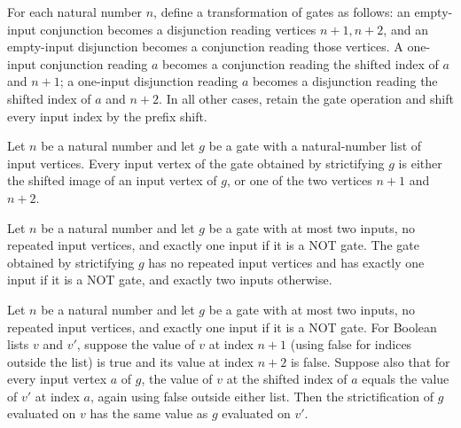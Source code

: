 \begin{definition}
\label{BoolCircuit.strictGate}
\leanok
{}
For each natural number $n$, define a transformation of gates as follows: an empty-input
conjunction becomes a disjunction reading vertices $n+1,n+2$, and an empty-input
disjunction becomes a conjunction reading those vertices. A one-input conjunction
reading $a$ becomes a conjunction reading the shifted index of $a$ and $n+1$; a
one-input disjunction reading $a$ becomes a disjunction reading the shifted index of $a$
and $n+2$. In all other cases, retain the gate operation and shift every input index by
the prefix shift.
\end{definition}

\begin{theorem}
\label{BoolCircuit.strictGate_args}
\leanok
{}
Let $n$ be a natural number and let $g$ be a gate with a natural-number list of input
vertices. Every input vertex of the gate obtained by strictifying $g$ is either the
shifted image of an input vertex of $g$, or one of the two vertices $n+1$ and $n+2$.
\end{theorem}

\begin{theorem}
\label{BoolCircuit.strictGate_strict}
\leanok
{}
Let $n$ be a natural number and let $g$ be a gate with at most two inputs, no repeated
input vertices, and exactly one input if it is a NOT gate. The gate obtained by
strictifying $g$ has no repeated input vertices and has exactly one input if it is a NOT
gate, and exactly two inputs otherwise.
\end{theorem}

\begin{theorem}
\label{BoolCircuit.strictGate_eval}
\leanok
{}
Let $n$ be a natural number and let $g$ be a gate with at most two inputs, no repeated
input vertices, and exactly one input if it is a NOT gate. For Boolean lists $v$ and
$v'$, suppose the value of $v$ at index $n+1$ (using false for indices outside the list)
is true and its value at index $n+2$ is false. Suppose also that for every input vertex
$a$ of $g$, the value of $v$ at the shifted index of $a$ equals the value of $v'$ at
index $a$, again using false outside either list. Then the strictification of $g$
evaluated on $v$ has the same value as $g$ evaluated on $v'$.
\end{theorem}


